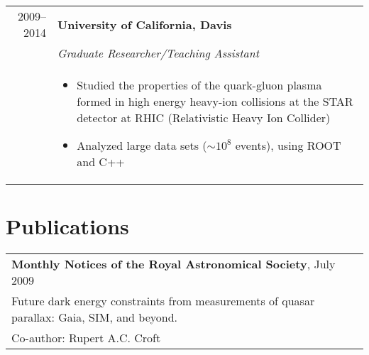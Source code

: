 \documentclass[letterpaper,10pt]{article}
\newif\ifpubl
\begin{document}
\begin{tabular}{rp{13cm}}
	2009--2014 & \textbf{University of California, Davis} \\
		& \emph{Graduate Researcher/Teaching Assistant}\\
		&
			\begin{itemize}
			\item Studied the properties of the quark-gluon plasma formed in high energy heavy-ion collisions at the STAR detector at RHIC (Relativistic Heavy Ion Collider)
			\item Analyzed large data sets ($\sim10^8$ events), using ROOT and C++
			\end{itemize} 
\end{tabular}

\ifpubl
	\section{Publications}
	\begin{tabular}{l}
	\textbf{Monthly Notices of the Royal Astronomical Society}, July 2009 \\
	Future dark energy constraints from measurements of quasar parallax: Gaia, SIM, and beyond. \\
	Co-author: Rupert A.C. Croft
	\end{tabular}
\end{document}
